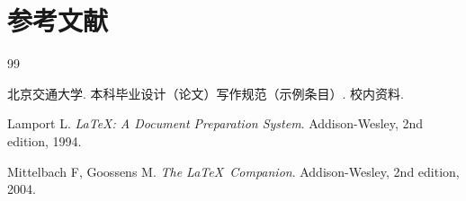 \cleardoublepage
{}
\chapter*{参考文献}

\begin{thebibliography}{99}

北京交通大学.
\newblock 本科毕业设计（论文）写作规范（示例条目）.
\newblock 校内资料.

Lamport L.
\newblock \emph{\LaTeX: A Document Preparation System}.
\newblock Addison-Wesley, 2nd edition, 1994.

Mittelbach F, Goossens M.
\newblock \emph{The \LaTeX\ Companion}.
\newblock Addison-Wesley, 2nd edition, 2004.

\end{thebibliography}
